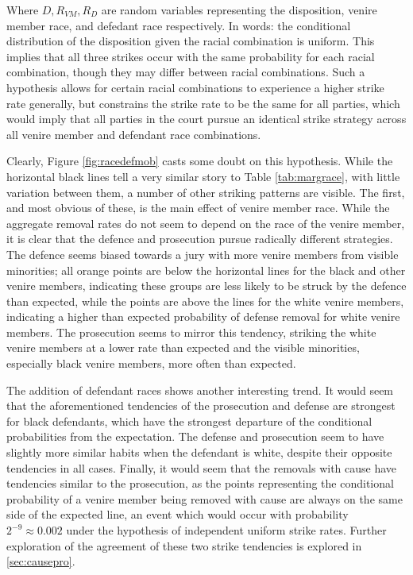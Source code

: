 Where $D, R_{VM}, R_D$ are random variables representing the disposition, venire member race, and defedant race respectively. In
words: the conditional distribution of the disposition given the racial combination is uniform. This implies that all
three strikes occur with the same probability for each racial combination, though they may differ between racial
combinations. Such a hypothesis allows for certain racial combinations to experience a higher strike rate generally, but
constrains the strike rate to be the same for all parties, which would imply that all parties in the court pursue an identical
strike strategy across all venire member and defendant race combinations.

Clearly, Figure \ref{fig:racedefmob} casts some doubt on this hypothesis. While the horizontal black lines tell a very similar
story to Table \ref{tab:margrace}, with little variation between them, a number of other striking patterns are visible. The first,
and most obvious of these, is the main effect of venire member race. While the aggregate removal rates do not seem to depend on
the race of the venire member, it is clear that the defence and prosecution pursue radically different strategies. The defence
seems biased towards a jury with more venire members from visible minorities; all orange points are below the horizontal lines for
the black and other venire members, indicating these groups are less likely to be struck by the defence than expected, while the
points are above the lines for the white venire members, indicating a higher than expected probability of defense removal for
white venire members. The prosecution seems to mirror this tendency, striking the white venire members at a lower rate than
expected and the visible minorities, especially black venire members, more often than expected.

The addition of defendant races shows another interesting trend. It would seem that the aforementioned tendencies of the
prosecution and defense are strongest for black defendants, which have the strongest departure of the conditional probabilities
from the expectation. The defense and prosecution seem to have slightly more similar habits when the defendant is white, despite
their opposite tendencies in all cases. Finally, it would seem that the removals with cause have tendencies similar to the
prosecution, as the points representing the conditional probability of a venire member being removed with cause are always on the
same side of the expected line, an event which would occur with probability $2^{-9} \approx 0.002$ under the hypothesis of
independent uniform strike rates. Further exploration of the agreement of these two strike tendencies is explored in
\ref{sec:causepro}.

